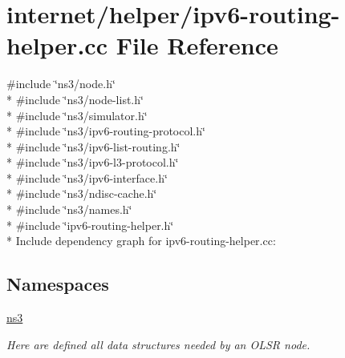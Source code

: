 \hypertarget{ipv6-routing-helper_8cc}{}\section{internet/helper/ipv6-\/routing-\/helper.cc File Reference}
\label{ipv6-routing-helper_8cc}
{\ttfamily \#include \char`\"{}ns3/node.\+h\char`\"{}}\\*
{\ttfamily \#include \char`\"{}ns3/node-\/list.\+h\char`\"{}}\\*
{\ttfamily \#include \char`\"{}ns3/simulator.\+h\char`\"{}}\\*
{\ttfamily \#include \char`\"{}ns3/ipv6-\/routing-\/protocol.\+h\char`\"{}}\\*
{\ttfamily \#include \char`\"{}ns3/ipv6-\/list-\/routing.\+h\char`\"{}}\\*
{\ttfamily \#include \char`\"{}ns3/ipv6-\/l3-\/protocol.\+h\char`\"{}}\\*
{\ttfamily \#include \char`\"{}ns3/ipv6-\/interface.\+h\char`\"{}}\\*
{\ttfamily \#include \char`\"{}ns3/ndisc-\/cache.\+h\char`\"{}}\\*
{\ttfamily \#include \char`\"{}ns3/names.\+h\char`\"{}}\\*
{\ttfamily \#include \char`\"{}ipv6-\/routing-\/helper.\+h\char`\"{}}\\*
Include dependency graph for ipv6-\/routing-\/helper.cc\+:
\subsection*{Namespaces}
\begin{DoxyCompactItemize}
\item 
 \hyperlink{namespacens3}{ns3}
\begin{DoxyCompactList}\small\item\em Here are defined all data structures needed by an O\+L\+SR node. \end{DoxyCompactList}\end{DoxyCompactItemize}
